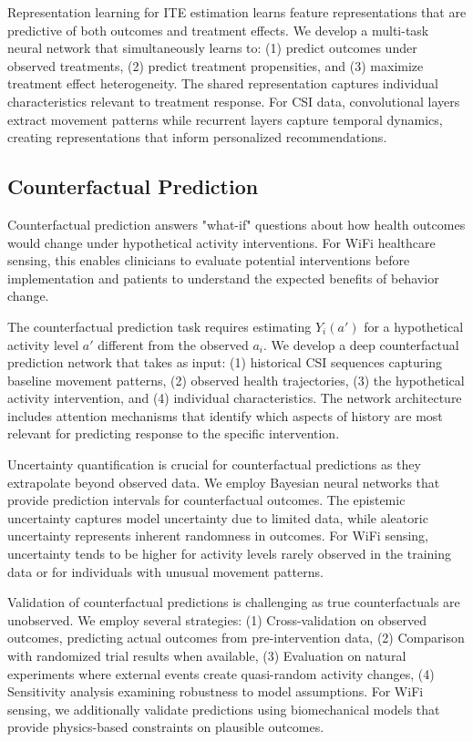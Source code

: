 \documentclass[journal]{IEEEtran}
\begin{document}
Representation learning for ITE estimation learns feature representations that are predictive of both outcomes and treatment effects. We develop a multi-task neural network that simultaneously learns to: (1) predict outcomes under observed treatments, (2) predict treatment propensities, and (3) maximize treatment effect heterogeneity. The shared representation captures individual characteristics relevant to treatment response. For CSI data, convolutional layers extract movement patterns while recurrent layers capture temporal dynamics, creating representations that inform personalized recommendations.

\subsection{Counterfactual Prediction}

Counterfactual prediction answers "what-if" questions about how health outcomes would change under hypothetical activity interventions. For WiFi healthcare sensing, this enables clinicians to evaluate potential interventions before implementation and patients to understand the expected benefits of behavior change.

The counterfactual prediction task requires estimating $Y_i(a')$ for a hypothetical activity level $a'$ different from the observed $a_i$. We develop a deep counterfactual prediction network that takes as input: (1) historical CSI sequences capturing baseline movement patterns, (2) observed health trajectories, (3) the hypothetical activity intervention, and (4) individual characteristics. The network architecture includes attention mechanisms that identify which aspects of history are most relevant for predicting response to the specific intervention.

Uncertainty quantification is crucial for counterfactual predictions as they extrapolate beyond observed data. We employ Bayesian neural networks that provide prediction intervals for counterfactual outcomes. The epistemic uncertainty captures model uncertainty due to limited data, while aleatoric uncertainty represents inherent randomness in outcomes. For WiFi sensing, uncertainty tends to be higher for activity levels rarely observed in the training data or for individuals with unusual movement patterns.

Validation of counterfactual predictions is challenging as true counterfactuals are unobserved. We employ several strategies: (1) Cross-validation on observed outcomes, predicting actual outcomes from pre-intervention data, (2) Comparison with randomized trial results when available, (3) Evaluation on natural experiments where external events create quasi-random activity changes, (4) Sensitivity analysis examining robustness to model assumptions. For WiFi sensing, we additionally validate predictions using biomechanical models that provide physics-based constraints on plausible outcomes.
\end{document}
